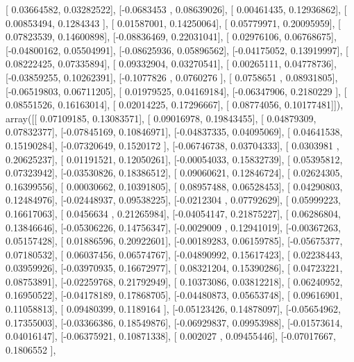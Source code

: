 \documentclass{article}
\begin{document}
       [ 0.03664582,  0.03282522],
       [-0.0683453 ,  0.08639026],
       [ 0.00461435,  0.12936862],
       [ 0.00853494,  0.1284343 ],
       [ 0.01587001,  0.14250064],
       [ 0.05779971,  0.20095959],
       [ 0.07823539,  0.14600898],
       [-0.08836469,  0.22031041],
       [ 0.02976106,  0.06768675],
       [-0.04800162,  0.05504991],
       [-0.08625936,  0.05896562],
       [-0.04175052,  0.13919997],
       [ 0.08222425,  0.07335894],
       [ 0.09332904,  0.03270541],
       [ 0.00265111,  0.04778736],
       [-0.03859255,  0.10262391],
       [-0.1077826 ,  0.0760276 ],
       [ 0.0758651 ,  0.08931805],
       [-0.06519803,  0.06711205],
       [ 0.01979525,  0.04169184],
       [-0.06347906,  0.2180229 ],
       [ 0.08551526,  0.16163014],
       [ 0.02014225,  0.17296667],
       [ 0.08774056,  0.10177481]]), array([[ 0.07109185,  0.13083571],
       [ 0.09016978,  0.19843455],
       [ 0.04879309,  0.07832377],
       [-0.07845169,  0.10846971],
       [-0.04837335,  0.04095069],
       [ 0.04641538,  0.15190284],
       [-0.07320649,  0.1520172 ],
       [-0.06746738,  0.03704333],
       [ 0.0303981 ,  0.20625237],
       [ 0.01191521,  0.12050261],
       [-0.00054033,  0.15832739],
       [ 0.05395812,  0.07323942],
       [-0.03530826,  0.18386512],
       [ 0.09060621,  0.12846724],
       [ 0.02624305,  0.16399556],
       [ 0.00030662,  0.10391805],
       [ 0.08957488,  0.06528453],
       [ 0.04290803,  0.12484976],
       [-0.02448937,  0.09538225],
       [-0.0212304 ,  0.07792629],
       [ 0.05999223,  0.16617063],
       [ 0.0456634 ,  0.21265984],
       [-0.04054147,  0.21875227],
       [ 0.06286804,  0.13846646],
       [-0.05306226,  0.14756347],
       [-0.0029009 ,  0.12941019],
       [-0.00367263,  0.05157428],
       [ 0.01886596,  0.20922601],
       [-0.00189283,  0.06159785],
       [-0.05675377,  0.07180532],
       [ 0.06037456,  0.06574767],
       [-0.04890992,  0.15617423],
       [ 0.02238443,  0.03959926],
       [-0.03970935,  0.16672977],
       [ 0.08321204,  0.15390286],
       [ 0.04723221,  0.08753891],
       [-0.02259768,  0.21792949],
       [ 0.10373086,  0.03812218],
       [ 0.06240952,  0.16950522],
       [-0.04178189,  0.17868705],
       [-0.04480873,  0.05653748],
       [ 0.09616901,  0.11058813],
       [ 0.09480399,  0.1189164 ],
       [-0.05123426,  0.14878097],
       [-0.05654962,  0.17355003],
       [-0.03366386,  0.18549876],
       [-0.06929837,  0.09953988],
       [-0.01573614,  0.04016147],
       [-0.06375921,  0.10871338],
       [ 0.002027  ,  0.09455446],
       [-0.07017667,  0.1806552 ],
\end{document}
